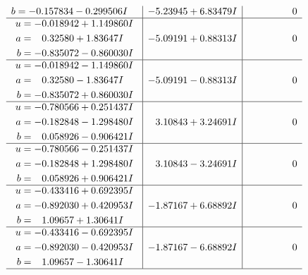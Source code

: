 \documentclass[1p]{elsarticle_modified}
\theoremstyle{definition}
\begin{document}
$$\begin{array}{c|c|c}
\begin{aligned}
b &= -0.157834 - 0.299506 I\end{aligned}
 & -5.23945 + 6.83479 I & \phantom{-0.000000 } 0 \\ \hline\begin{aligned}
u &= -0.018942 + 1.149860 I \\
a &= \phantom{-}0.32580 + 1.83647 I \\
b &= -0.835072 - 0.860030 I\end{aligned}
 & -5.09191 + 0.88313 I & \phantom{-0.000000 } 0 \\ \hline\begin{aligned}
u &= -0.018942 - 1.149860 I \\
a &= \phantom{-}0.32580 - 1.83647 I \\
b &= -0.835072 + 0.860030 I\end{aligned}
 & -5.09191 - 0.88313 I & \phantom{-0.000000 } 0 \\ \hline\begin{aligned}
u &= -0.780566 + 0.251437 I \\
a &= -0.182848 - 1.298480 I \\
b &= \phantom{-}0.058926 - 0.906421 I\end{aligned}
 & \phantom{-}3.10843 + 3.24691 I & \phantom{-0.000000 } 0 \\ \hline\begin{aligned}
u &= -0.780566 - 0.251437 I \\
a &= -0.182848 + 1.298480 I \\
b &= \phantom{-}0.058926 + 0.906421 I\end{aligned}
 & \phantom{-}3.10843 - 3.24691 I & \phantom{-0.000000 } 0 \\ \hline\begin{aligned}
u &= -0.433416 + 0.692395 I \\
a &= -0.892030 + 0.420953 I \\
b &= \phantom{-}1.09657 + 1.30641 I\end{aligned}
 & -1.87167 + 6.68892 I & \phantom{-0.000000 } 0 \\ \hline\begin{aligned}
u &= -0.433416 - 0.692395 I \\
a &= -0.892030 - 0.420953 I \\
b &= \phantom{-}1.09657 - 1.30641 I\end{aligned}
 & -1.87167 - 6.68892 I & \phantom{-0.000000 } 0\\
 \hline 
 \end{array}$$\newpage$$\begin{array}{c|c|c}  

\end{array}$$
\end{document}
